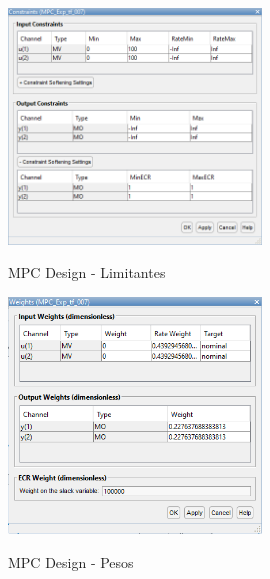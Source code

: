 \begin{apendicesenv}
\begin{figure}[!h]
	\caption{MPC Design - Limitantes}
	\begin{center}
		\includegraphics[width=0.60\textwidth]{./5_images/mpcdesign_constraints.png} 
		\label{fig:mpcdesign_constraints}
	\end{center}
	\centering
\end{figure}

\begin{figure}[!h]
	\caption{MPC Design - Pesos}
	\begin{center}
		\includegraphics[width=0.60\textwidth]{./5_images/mpcdesign_weights.png} 
		\label{fig:mpcdesign_weights}
	\end{center}
	\centering
\end{figure}


\end{apendicesenv}
